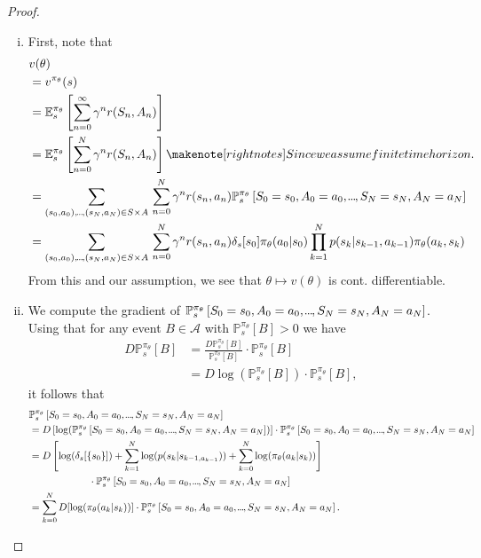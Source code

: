 \begin{proof}
\begin{enumerate}[(i)]
    \item First, note that 
    \begin{align*}
        &v(\theta) \\
        &= v^{\pi_\theta}(s) \\
        &= \mathbb{E}_s^{\pi_\theta} \left[ \sum_{n=0}^\infty \gamma^n r(S_n, A_n) \right]\\
        &= \mathbb{E}_s^{\pi_\theta} \left[ \sum_{ n=0}^N \gamma^n r(S_n, A_n) \right]\note{Since we assume finite time horizon.}\\
        &= \sum_{(s_{0},a_{0}),\mydots,(s_N, a_N) \in S \times A}\, \sum_{ n = 0}^N \gamma^n r(s_n, a_n) \mathbb{P}_s^{\pi_\theta} \left[ S_{0} = s_{0}, A_{0} = a_{0},\mydots, S_N = s_N, A_N = a_N \right]\\
        &= \sum_{(s_{0},a_{0}),\mydots,(s_N, a_N) \in S \times A}\, \sum_{ n = 0}^N \gamma^n r(s_n, a_n) \delta_s[{s_{0}}] \pi_\theta(a_{0}|s_{0}) \prod_{k=1}^{N} p(s_k | s_{k-1}, a_{k-1}) \pi_\theta(a_k, s_k)
    \end{align*}
    From this and our assumption, we see that \( \theta \mapsto v(\theta) \) is cont. differentiable. 

    \item We compute the gradient of \( \mathbb{P}_s^{\pi_\theta} \left[ S_{0} = s_{0}, A_{0} = a_{0},\kern-0.10em.\kern-0.06em.\kern-0.06em.\kern-0.1em, S_N = s_N, A_N = a_N \right] \).
    Using that for any event \( B \in \mathcal{A} \) with \( \mathbb{P}_s^{\pi_\theta}[B] > 0 \)  we have
    \begin{align*}
         D\mathbb{P}_s^{\pi_\theta}[B] &= \frac{D\mathbb{P}_s^{\pi_\theta}[B]}{\mathbb{P}_s^{\pi_\theta}[B]} \cdot \mathbb{P}_s^{\pi_\theta}[B] \\
         &= D \log(\mathbb{P}_s^{\pi_\theta}[B]) \cdot \mathbb{P}_s^{\pi_\theta}[B],
    \end{align*}
    it follows that 
    \begin{align*}
        &\mathbb{P}_s^{\pi_\theta} \left[ S_{0} = s_{0}, A_{0} = a_{0},\kern-0.10em.\kern-0.06em.\kern-0.06em.\kern-0.1em, S_N = s_N, A_N = a_N \right] \\
        &= D \left[ \log(\mathbb{P}_s^{\pi_\theta} \left[ S_{0} = s_{0}, A_{0} = a_{0},\kern-0.10em.\kern-0.06em.\kern-0.06em.\kern-0.1em, S_N = s_N, A_N = a_N \right]) \right] \cdot \mathbb{P}_s^{\pi_\theta} \left[ S_{0} = s_{0}, A_{0} = a_{0},\kern-0.10em.\kern-0.06em.\kern-0.06em.\kern-0.1em, S_N = s_N, A_N = a_N \right]\\
        &= D \left[ \log(\delta_s[\left\{ s_{0} \right\}]) +  \sum_{k=1}^N \log(p(s_k|s_{k-1, a_{k-1}})) + \sum_{k=0}^N \log(\pi_\theta(a_k|s_k)) \right]\\
        &\qquad \qquad \qquad \cdot \mathbb{P}_s^{\pi_\theta} \left[ S_{0} = s_{0}, A_{0} = a_{0},\kern-0.10em.\kern-0.06em.\kern-0.06em.\kern-0.1em, S_N = s_N, A_N = a_N \right]\\
        &= \sum_{k=0}^N D[\log(\pi_\theta(a_k | s_k))] \cdot \mathbb{P}_s^{\pi_\theta} \left[ S_{0} = s_{0}, A_{0} = a_{0},\kern-0.10em.\kern-0.06em.\kern-0.06em.\kern-0.1em, S_N = s_N, A_N = a_N \right].
    \end{align*}


\end{enumerate}
\end{proof}
